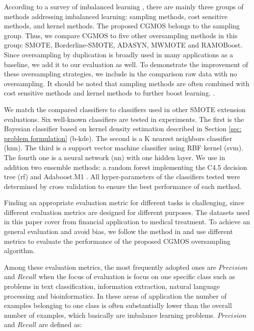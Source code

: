 \documentclass{iitthesis}
\begin{document}
 According to a survey of imbalanced learning \cite{HH:09}, there are mainly three groups of methods addressing imbalanced learning: sampling methods, cost sensitive methods, and kernel methods. The proposed CGMOS belongs to the sampling group. Thus, we compare CGMOS to five other oversampling methods in this group: SMOTE\cite{CNV:02}, Borderline-SMOTE\cite{HH:05}, ADASYN\cite{HH:08}, MWMOTE\cite{barua2014mwmote} and RAMOBoost\cite{chen2010ramoboost}. Since oversampling by duplication is broadly used in many applications as a baseline, we add it to our evaluation as well. To demonstrate the improvement of these oversampling strategies, we include in the comparison raw data with no oversampling. It should be noted that sampling methods are often combined with cost sensitive methods and kernel methods to further boost learning. \cite{chawla2004editorial}\cite{chawla2003smoteboost}\cite{guo2004learning}.

 We match the compared classifiers to classifiers used in other SMOTE extension evaluations. Six well-known classifiers are tested in experiments. The first is the Bayesian classifier based on kernel density estimation described in Section \ref{sec: problem formulation} (b-kde). The second is a K nearest neighbors classifier (knn). The third is a support vector machine classifier using RBF kernel (svm). The fourth one is a neural network (nn) with one hidden layer. We use in addition two ensemble methods: a random forest implementing the C4.5 decision tree \cite{Quinlan:1993} (rf) and Adaboost.M1 \cite{fy:1996}. All hyper-parameters of the classifiers tested were determined by cross validation to ensure the best performance of each method.

 Finding an appropriate evaluation metric for different tasks is challenging, since different evaluation metrics are designed for different purposes. The datasets used in this paper cover from financial application to medical treatment. To achieve an general evaluation and avoid bias, we follow the method in \cite{CNV:02}\cite{HH:05}\cite{HH:08}\cite{barua2014mwmote}\cite{chen2010ramoboost} and use different metrics to evaluate the performance of the proposed CGMOS oversampling algorithm.

Among these evaluation metrics, the most frequently adopted ones are $Precision$ and $Recall$ when the focus of evaluation is focus on one specific class such as problems in text classification, information extraction, natural language processing and bioinformatics. In these areas of application the number of examples belonging to one class is often substantially lower than the overall number of examples, which basically are imbalance learning problems. $Precision$ and $Recall$ are defined as:
\end{document}
